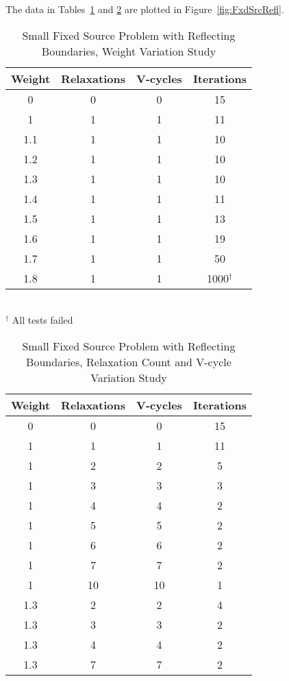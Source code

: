 The data in Tables~\ref{table:FxdSrcTstReflWeight} and \ref{table:FxdSrcTstReflRV} are plotted in Figure~\ref{fig:FxdSrcRefl}.
\begin{table}[!h]
\caption{Small Fixed Source Problem with Reflecting Boundaries, Weight Variation Study}
\begin{center}
\begin{tabular}{c c c c}
\hline
Weight & Relaxations & V-cycles & Iterations \\[0.5ex]
\hline
0    & 0 & 0 & 15 \\
1    & 1 & 1 & 11 \\
1.1 & 1 & 1 & 10 \\
1.2 & 1 & 1 & 10 \\
1.3 & 1 & 1 & 10 \\
1.4 & 1 & 1 & 11 \\
1.5 & 1 & 1 & 13 \\
1.6 & 1 & 1 & 19 \\
1.7 & 1 & 1 & 50 \\
1.8 & 1 & 1 & 1000$^{\dagger}$ \\
\hline 
\end{tabular} \\
$^{\dagger}$ All tests failed
\end{center}
\label{table:FxdSrcTstReflWeight}
\end{table}

\begin{table}[!h]
\caption{Small Fixed Source Problem with Reflecting Boundaries, Relaxation Count and V-cycle Variation Study}
\begin{center}
\begin{tabular}{c c c c}
\hline
Weight & Relaxations & V-cycles & Iterations \\[0.5ex]
\hline
0  & 0 & 0 & 15 \\
1 & 1 & 1 & 11 \\
1 & 2 & 2 & 5 \\
1 & 3 & 3 & 3 \\
1 & 4 & 4 & 2 \\
1 & 5 & 5 & 2 \\
1 & 6 & 6 & 2 \\
1 & 7 & 7 & 2 \\
1 & 10 & 10 & 1 \\
\hline
1.3 & 2 & 2 & 4 \\
1.3 & 3 & 3 & 2 \\
1.3 & 4 & 4 & 2 \\
1.3 & 7 & 7 & 2 \\
\hline 
\end{tabular}
\end{center}
\label{table:FxdSrcTstReflRV}
\end{table}


